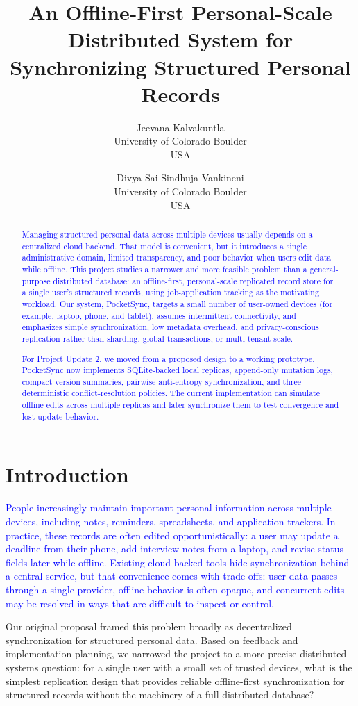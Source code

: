 \documentclass[10pt,twocolumn]{article}
\title{\textbf{An Offline-First Personal-Scale Distributed System for\\
Synchronizing Structured Personal Records}}
\author{
Jeevana Kalvakuntla\\
University of Colorado Boulder\\
USA
\and
Divya Sai Sindhuja Vankineni\\
University of Colorado Boulder\\
USA
}
\date{}
\newcommand{\update}[1]{\textcolor{blue}{#1}}
\begin{document}
\maketitle

\begin{abstract}
\update{Managing structured personal data across multiple devices usually depends on a centralized cloud backend. That model is convenient, but it introduces a single administrative domain, limited transparency, and poor behavior when users edit data while offline. This project studies a narrower and more feasible problem than a general-purpose distributed database: an offline-first, personal-scale replicated record store for a single user's structured records, using job-application tracking as the motivating workload. Our system, PocketSync, targets a small number of user-owned devices (for example, laptop, phone, and tablet), assumes intermittent connectivity, and emphasizes simple synchronization, low metadata overhead, and privacy-conscious replication rather than sharding, global transactions, or multi-tenant scale.}

\update{For Project Update 2, we moved from a proposed design to a working prototype. PocketSync now implements SQLite-backed local replicas, append-only mutation logs, compact version summaries, pairwise anti-entropy synchronization, and three deterministic conflict-resolution policies. The current implementation can simulate offline edits across multiple replicas and later synchronize them to test convergence and lost-update behavior.}
\end{abstract}

\section{Introduction}

\update{People increasingly maintain important personal information across multiple devices, including notes, reminders, spreadsheets, and application trackers. In practice, these records are often edited opportunistically: a user may update a deadline from their phone, add interview notes from a laptop, and revise status fields later while offline. Existing cloud-backed tools hide synchronization behind a central service, but that convenience comes with trade-offs: user data passes through a single provider, offline behavior is often opaque, and concurrent edits may be resolved in ways that are difficult to inspect or control.}

Our original proposal framed this problem broadly as decentralized synchronization for structured personal data. Based on feedback and implementation planning, we narrowed the project to a more precise distributed systems question: for a single user with a small set of trusted devices, what is the simplest replication design that provides reliable offline-first synchronization for structured records without the machinery of a full distributed database?
\end{document}
